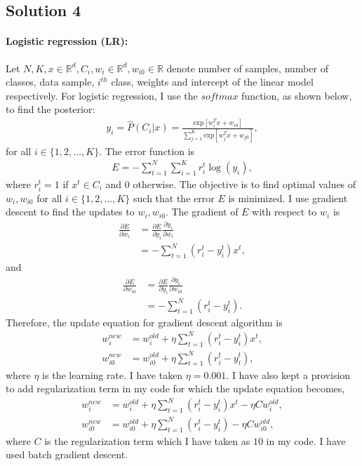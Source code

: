 \subsection*{Solution 4}
\paragraph{Logistic regression (LR):} Let $N, K, x\in \mathbb{R}^d, C_i, w_i \in \mathbb{R}^d, w_{i0} \in \mathbb{R}$ denote number of samples, number of classes, data sample, $i^{th}$ class, weights and intercept of the linear model respectively. For logistic regression, I use the $softmax$ function, as shown below, to find the posterior:
\begin{align*}
y_i = \hat{P}(C_i | x) = \frac{\text{exp}[w_i^Tx + w_{i0}]}{\sum_{j=1}^K\text{exp}[w_j^Tx + w_{j0}]},
\end{align*}
for all $i \in \{1,2,\ldots, K\}$. The error function is
\begin{align*}
E = -\sum_{t=1}^N \sum_{i=1}^K r_i^t \log(y_i),
\end{align*}
where $r_i^t = 1$ if $x^t \in C_i$ and $0$ otherwise. The objective is to find optimal values of $w_i, w_{i0}$ for all $i \in \{1,2,\ldots,K\}$ such that the error $E$ is minimized. I use gradient descent to find the updates to $w_i, w_{i0}$. The gradient of $E$ with respect to $w_i$ is
\begin{align*}
\frac{\partial E}{\partial w_i} &= \frac{\partial E}{\partial y_i} \frac{\partial y_i}{\partial w_i}\\
&= -\sum_{t=1}^N(r_i^t - y_i^t)x^t,
\end{align*}
and
\begin{align*}
\frac{\partial E}{\partial w_{i0}} &= \frac{\partial E}{\partial y_i}\frac{\partial y_i}{\partial w_{i0}}\\
&= -\sum_{t=1}^N(r_i^t - y_i^t).
\end{align*}
Therefore, the update equation for gradient descent algorithm is
\begin{align*}
w_i^{new} &= w_i^{old} + \eta \sum_{t=1}^N(r_i^t - y_i^t)x^t,\\
w_{i0}^{new} &= w_{i0}^{old} + \eta \sum_{t=1}^N(r_i^t - y_i^t),
\end{align*}
where $\eta$ is the learning rate. I have taken $\eta=0.001$. I have also kept a provision to add regularization term in my code for which the update equation becomes,
\begin{align*}
w_i^{new} &= w_i^{old} + \eta \sum_{t=1}^N(r_i^t - y_i^t)x^t -\eta C w_i^{old},\\
w_{i0}^{new} &= w_{i0}^{old} + \eta \sum_{t=1}^N(r_i^t - y_i^t) - \eta C w_{i0}^{old},
\end{align*}
where $C$ is the regularization term which I have taken as $10$ in my code. I have used batch gradient descent.
